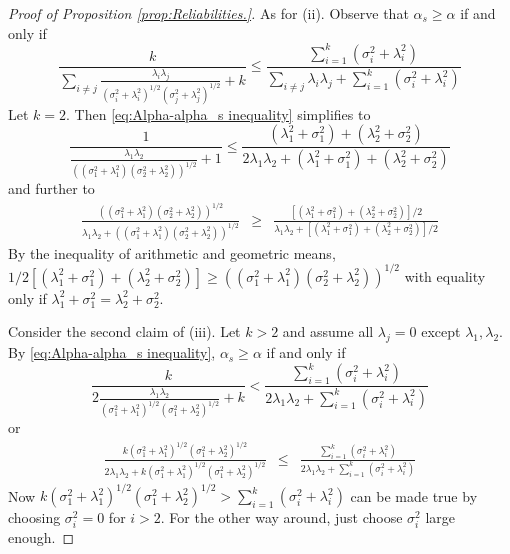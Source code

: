 \documentclass[twoside]{article}
\renewcommand{\sqrt}[1]{{(#1)^{1/2}}}
\begin{document}
\begin{proof}[Proof of Proposition \ref{prop:Reliabilities.}]
As for (ii). Observe that $\alpha_{s}\geq\alpha$
if and only if
\begin{equation}
\label{eq:Alpha-alpha_s inequality}
\frac{k}{\sum_{i\neq j}\frac{\lambda_{i}\lambda_{j}}{\sqrt{\sigma_{i}^{2}+\lambda_{i}^{2}}\sqrt{\sigma_{j}^{2}+\lambda_{j}^{2}}}+k}\leq\frac{\sum_{i=1}^{k}\left(\sigma_{i}^{2}+\lambda_{i}^{2}\right)}{\sum_{i\neq j}\lambda_{i}\lambda_{j}+\sum_{i=1}^{k}\left(\sigma_{i}^{2}+\lambda_{i}^{2}\right)}
\end{equation}
Let $k=2$. Then \eqref{eq:Alpha-alpha_s inequality} simplifies to
\[
\frac{1}{\frac{\lambda_{1}\lambda_{2}}{\sqrt{\left(\sigma_{1}^{2}+\lambda_{1}^{2}\right)\left(\sigma_{2}^{2}+\lambda_{2}^{2}\right)}}+1}\leq\frac{\left(\lambda_{1}^{2}+\sigma_{1}^{2}\right)+\left(\lambda_{2}^{2}+\sigma_{2}^{2}\right)}{2\lambda_{1}\lambda_{2}+\left(\lambda_{1}^{2}+\sigma_{1}^{2}\right)+\left(\lambda_{2}^{2}+\sigma_{2}^{2}\right)}
\]
and further to
\begin{eqnarray*}
\frac{\sqrt{\left(\sigma_{1}^{2}+\lambda_{1}^{2}\right)\left(\sigma_{2}^{2}+\lambda_{2}^{2}\right)}}{\lambda_{1}\lambda_{2}+\sqrt{\left(\sigma_{1}^{2}+\lambda_{1}^{2}\right)\left(\sigma_{2}^{2}+\lambda_{2}^{2}\right)}} & \geq & \frac{\left[\left(\lambda_{1}^{2}+\sigma_{1}^{2}\right)+\left(\lambda_{2}^{2}+\sigma_{2}^{2}\right)\right]/2}{\lambda_{1}\lambda_{2}+\left[\left(\lambda_{1}^{2}+\sigma_{1}^{2}\right)+\left(\lambda_{2}^{2}+\sigma_{2}^{2}\right)\right]/2}
\end{eqnarray*}
By the inequality of arithmetic and geometric means, $1/2\left[\left(\lambda_{1}^{2}+\sigma_{1}^{2}\right)+\left(\lambda_{2}^{2}+\sigma_{2}^{2}\right)\right]\geq\sqrt{\left(\sigma_{1}^{2}+\lambda_{1}^{2}\right)\left(\sigma_{2}^{2}+\lambda_{2}^{2}\right)}$
with equality only if $\lambda_{1}^{2}+\sigma_{1}^{2}=\lambda_{2}^{2}+\sigma_{2}^{2}$.

Consider the second claim of (iii). Let $k>2$ and assume all $\lambda_{j}=0$
except $\lambda_{1},\lambda_{2}$. By \eqref{eq:Alpha-alpha_s inequality}, $\alpha_s \geq \alpha$ if and
only if
\[
\frac{k}{2\frac{\lambda_{1}\lambda_{2}}{\sqrt{\sigma_{1}^{2}+\lambda_{1}^{2}}\sqrt{\sigma_{1}^{2}+\lambda_{2}^{2}}}+k}<\frac{\sum_{i=1}^{k}\left(\sigma_{i}^{2}+\lambda_{i}^{2}\right)}{2\lambda_{1}\lambda_{2}+\sum_{i=1}^{k}\left(\sigma_{i}^{2}+\lambda_{i}^{2}\right)}
\]
or
\begin{eqnarray*}
\frac{k\sqrt{\sigma_{1}^{2}+\lambda_{1}^{2}}\sqrt{\sigma_{1}^{2}+\lambda_{2}^{2}}}{2\lambda_{1}\lambda_{2}+k\sqrt{\sigma_{1}^{2}+\lambda_{1}^{2}}\sqrt{\sigma_{1}^{2}+\lambda_{2}^{2}}} & \leq & \frac{\sum_{i=1}^{k}\left(\sigma_{i}^{2}+\lambda_{i}^{2}\right)}{2\lambda_{1}\lambda_{2}+\sum_{i=1}^{k}\left(\sigma_{i}^{2}+\lambda_{i}^{2}\right)}
\end{eqnarray*}
Now $k\sqrt{\sigma_{1}^{2}+\lambda_{1}^{2}}\sqrt{\sigma_{1}^{2}+\lambda_{2}^{2}}>\sum_{i=1}^{k}\left(\sigma_{i}^{2}+\lambda_{i}^{2}\right)$
can be made true by choosing $\sigma_{i}^{2}=0$ for $i>2$. For the
other way around, just choose $\sigma_{i}^{2}$ large enough.


\end{proof}
\end{document}
